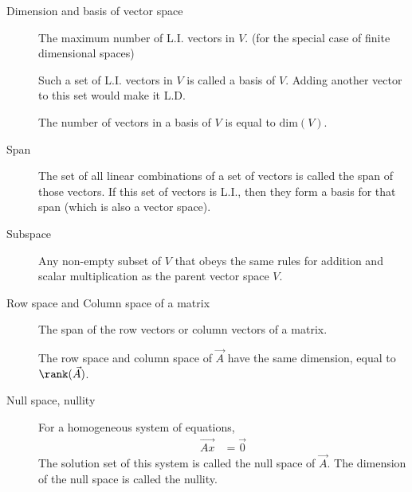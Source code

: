 \begin{description}
    \item[Dimension and basis of vector space] The maximum number of L.I. vectors
        in $ V $. (for the special case of finite dimensional spaces) \par
        Such a set of L.I. vectors in $ V $ is called a basis of $ V $. Adding another
        vector to this set would make it L.D. \par
        The number of vectors in a basis of $ V $ is equal to $ \text{dim}(V) $.

    \item[Span] The set of all linear combinations of a set of vectors is called the span
        of those vectors. If this set of vectors is L.I., then they form a basis for
        that span (which is also a vector space).

    \item[Subspace] Any non-empty subset of $ V $ that obeys the same rules for
        addition and scalar multiplication as the parent vector space $ V $.

    \item[Row space and Column space of a matrix] The span of the row vectors or column
        vectors of a matrix. \par
        The row space and column space of $ \vec{A} $ have the same dimension, equal to
        $ \rank(\vec{A}) $.

    \item[Null space, nullity] For a homogeneous system of equations,
        \begin{align}
            \vec{Ax} & = \vec{0}
        \end{align}
        The solution set of this system is called the null space of $ \vec{A} $. The
        dimension of the null space is called the nullity.
\end{description}


